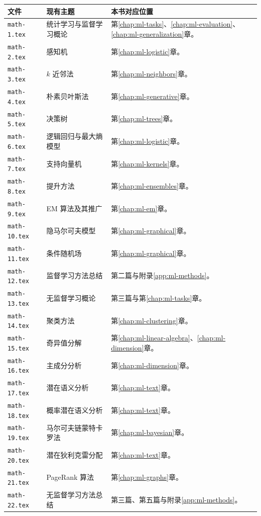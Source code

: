 \documentclass[UTF8,12pt,a4paper,fontset=fandol]{ctexbook}
\begin{document}
\begin{longtable}{@{}L{2.7cm}L{5.3cm}L{5.7cm}@{}}
  \toprule
  文件 & 现有主题 & 本书对应位置 \\
  \midrule
  \endhead
  \texttt{math-1.tex} & 统计学习与监督学习概论 & 第\ref{chap:ml-tasks}、\ref{chap:ml-evaluation}、\ref{chap:ml-generalization}章。\\
  \texttt{math-2.tex} & 感知机 & 第\ref{chap:ml-logistic}章。\\
  \texttt{math-3.tex} & $k$ 近邻法 & 第\ref{chap:ml-neighbors}章。\\
  \texttt{math-4.tex} & 朴素贝叶斯法 & 第\ref{chap:ml-generative}章。\\
  \texttt{math-5.tex} & 决策树 & 第\ref{chap:ml-trees}章。\\
  \texttt{math-6.tex} & 逻辑回归与最大熵模型 & 第\ref{chap:ml-logistic}章。\\
  \texttt{math-7.tex} & 支持向量机 & 第\ref{chap:ml-kernels}章。\\
  \texttt{math-8.tex} & 提升方法 & 第\ref{chap:ml-ensembles}章。\\
  \texttt{math-9.tex} & EM 算法及其推广 & 第\ref{chap:ml-em}章。\\
  \texttt{math-10.tex} & 隐马尔可夫模型 & 第\ref{chap:ml-graphical}章。\\
  \texttt{math-11.tex} & 条件随机场 & 第\ref{chap:ml-graphical}章。\\
  \texttt{math-12.tex} & 监督学习方法总结 & 第二篇与附录\ref{app:ml-methods}。\\
  \texttt{math-13.tex} & 无监督学习概论 & 第三篇与第\ref{chap:ml-tasks}章。\\
  \texttt{math-14.tex} & 聚类方法 & 第\ref{chap:ml-clustering}章。\\
  \texttt{math-15.tex} & 奇异值分解 & 第\ref{chap:ml-linear-algebra}、\ref{chap:ml-dimension}章。\\
  \texttt{math-16.tex} & 主成分分析 & 第\ref{chap:ml-dimension}章。\\
  \texttt{math-17.tex} & 潜在语义分析 & 第\ref{chap:ml-text}章。\\
  \texttt{math-18.tex} & 概率潜在语义分析 & 第\ref{chap:ml-text}章。\\
  \texttt{math-19.tex} & 马尔可夫链蒙特卡罗法 & 第\ref{chap:ml-bayesian}章。\\
  \texttt{math-20.tex} & 潜在狄利克雷分配 & 第\ref{chap:ml-text}章。\\
  \texttt{math-21.tex} & PageRank 算法 & 第\ref{chap:ml-graphs}章。\\
  \texttt{math-22.tex} & 无监督学习方法总结 & 第三篇、第五篇与附录\ref{app:ml-methods}。\\
  \bottomrule
\end{longtable}
\end{document}
